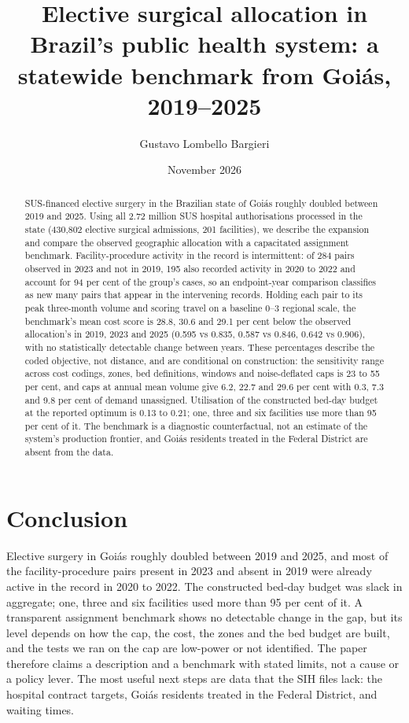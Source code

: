 \documentclass[11pt]{article}
\title{Elective surgical allocation in Brazil's public health system: a statewide
benchmark from Goi\'as, 2019--2025}
\author{Gustavo Lombello Bargieri}
\date{November 2026}
\begin{document}
\maketitle

\begin{abstract}
\noindent
SUS-financed elective surgery in the Brazilian state of Goi\'as roughly doubled between 2019 and 2025.
Using all 2.72 million SUS hospital authorisations processed in the state (430,802 elective surgical admissions, 201 facilities), we describe the expansion and compare the observed geographic allocation with a capacitated assignment benchmark.
Facility-procedure activity in the record is intermittent: of 284 pairs observed in 2023 and not in 2019, 195 also recorded activity in 2020 to 2022 and account for 94 per cent of the group's cases, so an endpoint-year comparison classifies as new many pairs that appear in the intervening records.
Holding each pair to its peak three-month volume and scoring travel on a baseline 0--3 regional scale, the benchmark's mean cost score is 28.8, 30.6 and 29.1 per cent below the observed allocation's in 2019, 2023 and 2025 (0.595 vs 0.835, 0.587 vs 0.846, 0.642 vs 0.906), with no statistically detectable change between years.
These percentages describe the coded objective, not distance, and are conditional on construction: the sensitivity range across cost codings, zones, bed definitions, windows and noise-deflated caps is 23 to 55 per cent, and caps at annual mean volume give 6.2, 22.7 and 29.6 per cent with 0.3, 7.3 and 9.8 per cent of demand unassigned.
Utilisation of the constructed bed-day budget at the reported optimum is 0.13 to 0.21; one, three and six facilities use more than 95 per cent of it.
The benchmark is a diagnostic counterfactual, not an estimate of the system's production frontier, and Goi\'as residents treated in the Federal District are absent from the data.
\end{abstract}







\section*{Conclusion}
Elective surgery in Goi\'as roughly doubled between 2019 and 2025, and most of the facility-procedure pairs present in 2023 and absent in 2019 were already active in the record in 2020 to 2022. The constructed bed-day budget was slack in aggregate; one, three and six facilities used more than 95 per cent of it. A transparent assignment benchmark shows no detectable change in the gap, but its level depends on how the cap, the cost, the zones and the bed budget are built, and the tests we ran on the cap are low-power or
not identified. The paper therefore claims a description and a benchmark with stated limits, not a cause or a policy lever. The most useful next steps are data that
the SIH files lack: the hospital contract targets, Goi\'as residents treated in the Federal District, and waiting times.
\end{document}

